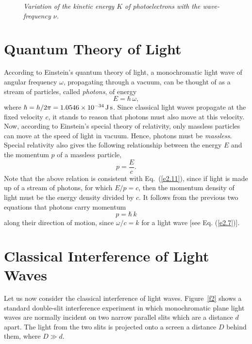 \begin{figure}
\epsfysize=3in
\centerline{}
\caption{\em Variation of the kinetic energy $K$ of photoelectrons with the wave-frequency $\nu$.}\label{f1}   
\end{figure}

\section{Quantum Theory of Light}
According to Einstein's quantum theory of light, a monochromatic light wave of angular
frequency $\omega$, propagating through a vacuum, can be thought of
as a stream of particles, called {\em photons}, of energy 
\begin{equation}\label{e2.17}
E = \hbar\,\omega,
\end{equation}
where $\hbar = h/2\pi = 1.0546\times 10^{-34}\,{\rm J\,s}$. Since 
classical light waves propagate at the fixed  velocity $c$, it stands to reason that photons
must also move at this velocity. Now, according to Einstein's special theory
of relativity, only massless particles can move at the speed of light in vacuum. Hence,
photons must be {\em massless}. Special relativity also gives the following
relationship between the energy $E$ and the momentum $p$ of a massless
particle,
\begin{equation}
p = \frac{E}{c}.
\end{equation}
Note that the above relation is consistent with Eq.~(\ref{e2.11}), since
if light is made up of a stream of photons, for which $E/p=c$, then the momentum density of light must be the energy density divided by $c$. 
It follows from the previous two equations that photons carry momentum
\begin{equation}\label{e2.19b}
p = \hbar\,k
\end{equation}
along their direction of motion,
since $\omega/c = k$ for a light wave [see Eq. (\ref{e2.7})]. 

\section{Classical Interference of Light Waves}
Let us now consider  the classical  interference of light waves. Figure~\ref{f2}
shows a standard double-slit interference experiment in which monochromatic plane light waves are normally incident on two narrow parallel
slits which are a distance $d$ apart. The light from the two slits is projected onto
a screen a distance $D$ behind them, where $D\gg d$. 

